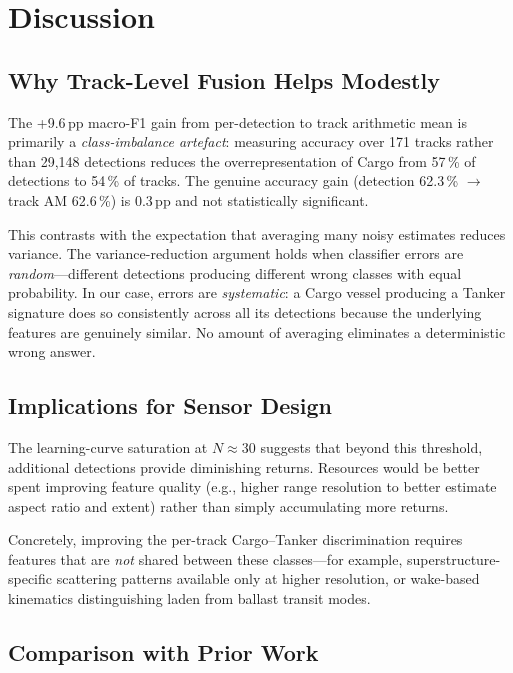 \documentclass[10pt,journal,compsoc]{IEEEtran}
\begin{document}
\section{Discussion}\label{sec:discussion}

\subsection{Why Track-Level Fusion Helps Modestly}

The +9.6\,pp macro-F1 gain from per-detection to track arithmetic mean is
primarily a \emph{class-imbalance artefact}: measuring accuracy over 171 tracks
rather than 29,148 detections reduces the overrepresentation of Cargo from
57\,\% of detections to 54\,\% of tracks.  The genuine accuracy gain (detection
62.3\,\% $\to$ track AM 62.6\,\%) is 0.3\,pp and not statistically significant.

This contrasts with the expectation that averaging many noisy estimates
reduces variance.  The variance-reduction argument holds when classifier
errors are \emph{random}---different detections producing different wrong
classes with equal probability.  In our case, errors are \emph{systematic}:
a Cargo vessel producing a Tanker signature does so consistently across all
its detections because the underlying features are genuinely similar.  No
amount of averaging eliminates a deterministic wrong answer.

\subsection{Implications for Sensor Design}

The learning-curve saturation at $N \approx 30$ suggests that beyond this
threshold, additional detections provide diminishing returns.  Resources would
be better spent improving feature quality (e.g., higher range resolution to
better estimate aspect ratio and extent) rather than simply accumulating more
returns.

Concretely, improving the per-track Cargo--Tanker discrimination requires
features that are \emph{not} shared between these classes---for example,
superstructure-specific scattering patterns available only at higher resolution,
or wake-based kinematics distinguishing laden from ballast transit modes.

\subsection{Comparison with Prior Work}
\end{document}
